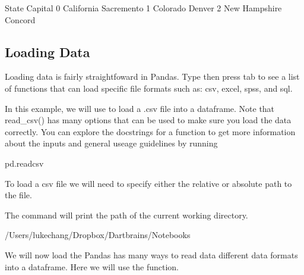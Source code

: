 \documentclass[letterpaper,10pt,english]{sphinxmanual}
\begin{document}
\begin{sphinxVerbatim}[commandchars=\\\{\}]
           State     Capital
0     California  Sacremento
1       Colorado      Denver
2  New Hampshire     Concord
\end{sphinxVerbatim}


\subsection{Loading Data}
\label{\detokenize{content/Introduction_to_Pandas:loading-data}}
Loading data is fairly straightfoward in Pandas. Type  then press tab to see a list of functions that can load specific file formats such as: csv, excel, spss, and sql.

In this example, we will use  to load a .csv file into a dataframe.
Note that read\_csv() has many options that can be used to make sure you load the data correctly. You can explore the docstrings for a function to get more information about the inputs and general useage guidelines by running 

\begin{sphinxVerbatim}[commandchars=\\\{\}]
pd.read\PYGZus{}csv
\end{sphinxVerbatim}

To load a csv file we will need to specify either the relative or absolute path to the file.

The command  will print the path of the current working directory.

\begin{sphinxVerbatim}[commandchars=\\\{\}]
\end{sphinxVerbatim}

\begin{sphinxVerbatim}[commandchars=\\\{\}]
\PYGZsq{}/Users/lukechang/Dropbox/Dartbrains/Notebooks\PYGZsq{}
\end{sphinxVerbatim}

We will now load the Pandas has many ways to read data different data formats into a dataframe.  Here we will use the  function.

\begin{sphinxVerbatim}[commandchars=\\\{\}]
     
\end{sphinxVerbatim}
\end{document}
